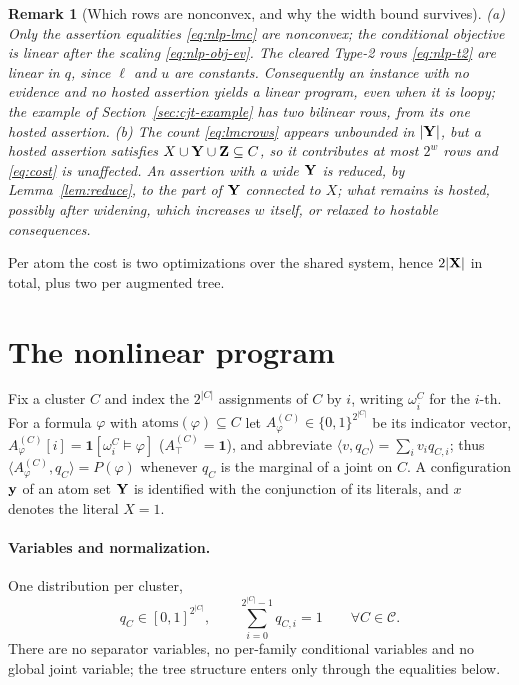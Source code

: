 \documentclass{article} %
\newtheorem{remark}{Remark}
\newcommand{\atoms}{\mathrm{atoms}}
\begin{document}
\begin{remark}[Which rows are nonconvex, and why the width bound survives]\label{rem:counting}
(a) Only the assertion equalities \eqref{eq:nlp-lmc} are nonconvex; the
conditional objective is linear after the scaling \eqref{eq:nlp-obj-ev}. The cleared Type-2 rows
\eqref{eq:nlp-t2} are \emph{linear} in $q$, since $\ell$ and $u$ are constants.
Consequently an instance with no evidence and no hosted assertion yields a
\emph{linear} program, even when it is loopy; the example of
Section~\ref{sec:cjt-example} has two bilinear rows, from its one hosted
assertion.
(b) The count \eqref{eq:lmcrows} appears unbounded in $|\mathbf{Y}|$, but a \emph{hosted}
assertion satisfies $X\cup \mathbf{Y}\cup \mathbf{Z}\subseteq C$, so it contributes at most
$2^{w}$ rows and \eqref{eq:cost} is unaffected. An assertion with a wide $\mathbf{Y}$ is reduced, by Lemma~\ref{lem:reduce}, to the part
of $\mathbf{Y}$ connected to $X$; what remains is hosted, possibly after widening, which
increases $w$ itself, or relaxed to hostable consequences.
\end{remark}

Per atom the cost is two optimizations over the shared system, hence $2|\mathbf{X}|$
in total, plus two per augmented tree.

\section{The nonlinear program}\label{sec:nlp}

Fix a cluster $C$ and index the $2^{|C|}$ assignments of $C$ by
$i$, writing $\omega^C_i$ for the $i$-th. For a formula $\varphi$ with
$\atoms(\varphi)\subseteq C$ let $A^{(C)}_\varphi\in\{0,1\}^{2^{|C|}}$ be
its indicator vector, $A^{(C)}_\varphi[i]=\mathbf 1[\omega^C_i\models\varphi]$
($A^{(C)}_\top=\mathbf 1$),
and abbreviate $\langle v,q_C\rangle=\sum_i v_iq_{C,i}$; thus
$\langle A^{(C)}_\varphi,q_C\rangle=P(\varphi)$ whenever $q_C$ is the marginal of
a joint on $C$. A configuration $\mathbf{y}$ of an atom set $\mathbf{Y}$ is identified with the
conjunction of its literals, and $x$ denotes the literal $X{=}1$.

\paragraph{Variables and normalization.}
One distribution per cluster,
\begin{equation}\label{eq:nlp-var}
  q_C\in[0,1]^{2^{|C|}},\qquad
  \sum_{i=0}^{2^{|C|}-1}q_{C,i}=1
  \qquad\forall C\in\mathcal C .
\end{equation}
There are no separator variables, no per-family conditional variables and no
global joint variable; the tree structure enters only through the equalities
below.
\end{document}
